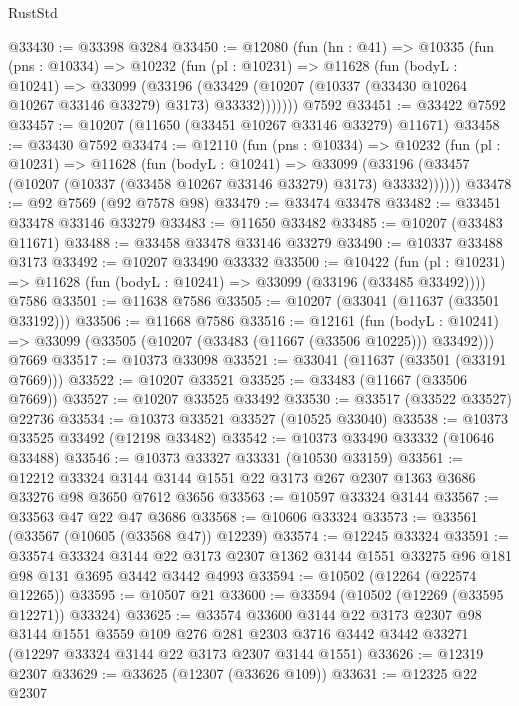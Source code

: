 \begin{lexlean}{RustStd}
\begin{coremodule}
@33430 := @33398 @3284
@33450 := @12080
    (fun (hn : @41) =>
    @10335
      (fun (pns : @10334) =>
      @10232
        (fun (pl : @10231) =>
        @11628
          (fun (bodyL : @10241) =>
          @33099
            (@33196
              (@33429 (@10207 (@10337 (@33430 @10264 @10267 @33146 @33279) @3173) @33332)))))))
    @7592
@33451 := @33422 @7592
@33457 := @10207 (@11650 (@33451 @10267 @33146 @33279) @11671)
@33458 := @33430 @7592
@33474 := @12110
    (fun (pns : @10334) =>
    @10232
      (fun (pl : @10231) =>
      @11628
        (fun (bodyL : @10241) =>
        @33099 (@33196 (@33457 (@10207 (@10337 (@33458 @10267 @33146 @33279) @3173) @33332))))))
@33478 := @92 @7569 (@92 @7578 @98)
@33479 := @33474 @33478
@33482 := @33451 @33478 @33146 @33279
@33483 := @11650 @33482
@33485 := @10207 (@33483 @11671)
@33488 := @33458 @33478 @33146 @33279
@33490 := @10337 @33488 @3173
@33492 := @10207 @33490 @33332
@33500 := @10422
    (fun (pl : @10231) => @11628 (fun (bodyL : @10241) => @33099 (@33196 (@33485 @33492))))
    @7586
@33501 := @11638 @7586
@33505 := @10207 (@33041 (@11637 (@33501 @33192)))
@33506 := @11668 @7586
@33516 := @12161
    (fun (bodyL : @10241) => @33099 (@33505 (@10207 (@33483 (@11667 (@33506 @10225))) @33492)))
    @7669
@33517 := @10373 @33098
@33521 := @33041 (@11637 (@33501 (@33191 @7669)))
@33522 := @10207 @33521
@33525 := @33483 (@11667 (@33506 @7669))
@33527 := @10207 @33525 @33492
@33530 := @33517 (@33522 @33527) @22736
@33534 := @10373 @33521 @33527 (@10525 @33040)
@33538 := @10373 @33525 @33492 (@12198 @33482)
@33542 := @10373 @33490 @33332 (@10646 @33488)
@33546 := @10373 @33327 @33331 (@10530 @33159)
@33561 := @12212
    @33324
    @3144
    @3144
    @1551
    @22
    @3173
    @267
    @2307
    @1363
    @3686
    @33276
    @98
    @3650
    @7612
    @3656
@33563 := @10597 @33324 @3144
@33567 := @33563 @47 @22 @47 @3686
@33568 := @10606 @33324
@33573 := @33561 (@33567 (@10605 (@33568 @47)) @12239)
@33574 := @12245 @33324
@33591 := @33574
    @33324
    @3144
    @22
    @3173
    @2307
    @1362
    @3144
    @1551
    @33275
    @96
    @181
    @98
    @131
    @3695
    @3442
    @3442
    @4993
@33594 := @10502 (@12264 (@22574 @12265))
@33595 := @10507 @21
@33600 := @33594 (@10502 (@12269 (@33595 @12271)) @33324)
@33625 := @33574
    @33600
    @3144
    @22
    @3173
    @2307
    @98
    @3144
    @1551
    @3559
    @109
    @276
    @281
    @2303
    @3716
    @3442
    @3442
    @33271
    (@12297 @33324 @3144 @22 @3173 @2307 @3144 @1551)
@33626 := @12319 @2307
@33629 := @33625 (@12307 (@33626 @109))
@33631 := @12325 @22 @2307

\end{coremodule}
\end{lexlean}
